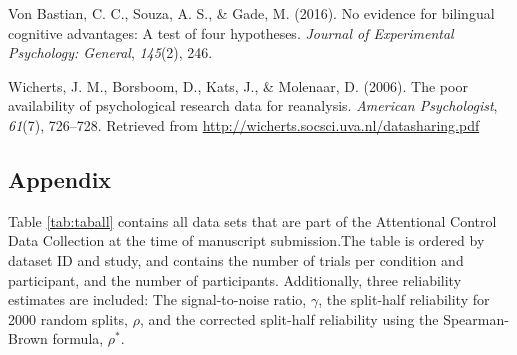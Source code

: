 \documentclass[
  man,floatsintext]{apa6}
\newlength{\cslhangindent}
\newlength{\cslentryspacingunit} %
\newenvironment{CSLReferences}[2] %
 {%
  \setlength{\parindent}{0pt}
  \ifodd #1
  \let\oldpar\par
  \def\par{\hangindent=\cslhangindent\oldpar}
  \fi
  \setlength{\parskip}{#2\cslentryspacingunit}
 }%
 {}
\begin{document}
\begin{CSLReferences}{1}{0}
\leavevmode{}%
Von Bastian, C. C., Souza, A. S., \& Gade, M. (2016). No evidence for bilingual cognitive advantages: A test of four hypotheses. \emph{Journal of Experimental Psychology: General}, \emph{145}(2), 246.

\leavevmode{}%
Wicherts, J. M., Borsboom, D., Kats, J., \& Molenaar, D. (2006). The poor availability of psychological research data for reanalysis. \emph{American Psychologist}, \emph{61}(7), 726--728. Retrieved from \url{http://wicherts.socsci.uva.nl/datasharing.pdf}

\end{CSLReferences}

\newpage

\hypertarget{appendix-appendix}{%
\appendix}


\hypertarget{appendix}{%
\subsection{Appendix}\label{appendix}}

Table \ref{tab:taball} contains all data sets that are part of the Attentional Control Data Collection at the time of manuscript submission.The table is ordered by dataset ID and study, and contains the number of trials per condition and participant, and the number of participants. Additionally, three reliability estimates are included: The signal-to-noise ratio, \(\gamma\), the split-half reliability for 2000 random splits, \(\rho\), and the corrected split-half reliability using the Spearman-Brown formula, \(\rho^*\).
\end{document}
